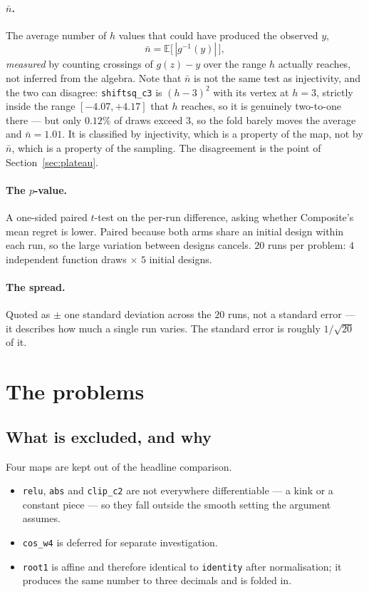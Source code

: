 \documentclass[11pt]{article}
\begin{document}
\paragraph{$\bar n$.} The average number of $h$ values that could have produced
the observed $y$,
\[
\bar n=\mathbb E\bigl[\,|g^{-1}(y)|\,\bigr],
\]
\emph{measured} by counting crossings of $g(z)-y$ over the range $h$ actually
reaches, not inferred from the algebra. Note that $\bar n$ is not the same
test as injectivity, and the two can disagree: \texttt{shiftsq\_c3} is
$(h-3)^{2}$ with its vertex at $h=3$, strictly inside the range
$[-4.07,+4.17]$ that $h$ reaches, so it is genuinely two-to-one there --- but
only $0.12\%$ of draws exceed $3$, so the fold barely moves the average and
$\bar n=1.01$. It is classified by injectivity, which is a property of the
map, not by $\bar n$, which is a property of the sampling. The disagreement
is the point of Section~\ref{sec:plateau}.

\paragraph{The $p$-value.} A one-sided paired $t$-test on the per-run
difference, asking whether Composite's mean regret is lower. Paired because
both arms share an initial design within each run, so the large variation
between designs cancels. $20$ runs per problem: $4$ independent function draws
$\times$ $5$ initial designs.

\paragraph{The spread.} Quoted as $\pm$ one standard deviation across the $20$
runs, not a standard error --- it describes how much a single run varies. The
standard error is roughly $1/\sqrt{20}$ of it.

\section{The problems}



\subsection{What is excluded, and why}

Four maps are kept out of the headline comparison.

\begin{itemize}\itemsep2pt
\item \texttt{relu}, \texttt{abs} and \texttt{clip\_c2} are not everywhere
differentiable --- a kink or a constant piece --- so they fall outside the
smooth setting the argument assumes.
\item \texttt{cos\_w4} is deferred for separate investigation.
\item \texttt{root1} is affine and therefore identical to \texttt{identity}
after normalisation; it produces the same number to three decimals and is
folded in.
\end{itemize}
\end{document}
